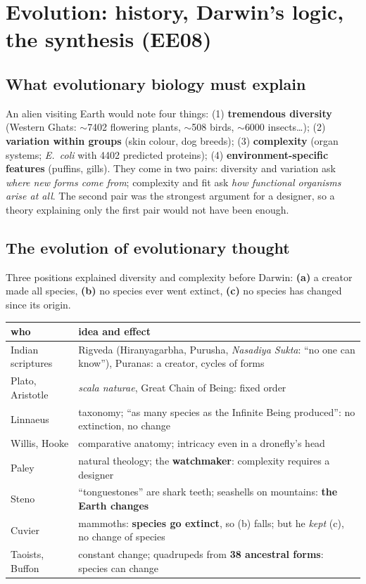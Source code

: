 \section{Evolution: history, Darwin's logic, the synthesis (EE08)}

\subsection{What evolutionary biology must explain}
An alien visiting Earth would note four things: (1) \textbf{tremendous diversity} (Western Ghats: $\sim$7402
flowering plants, $\sim$508 birds, $\sim$6000 insects\dots); (2) \textbf{variation within groups} (skin colour, dog
breeds); (3) \textbf{complexity} (organ systems; \emph{E.\ coli} with 4402 predicted proteins); (4)
\textbf{environment-specific features} (puffins, gills). They come in two pairs: diversity and variation ask
\emph{where new forms come from}; complexity and fit ask \emph{how functional organisms arise at all}. The second pair was
the strongest argument for a designer, so a theory explaining only the first pair would not have been enough.

\subsection{The evolution of evolutionary thought}
Three positions explained diversity and complexity before Darwin: \textbf{(a)} a creator made all species,
\textbf{(b)} no species ever went extinct, \textbf{(c)} no species has changed since its origin.

\begin{center}\small
\begin{tabularx}{\textwidth}{lX}
\toprule
who & idea and effect\\\midrule
Indian scriptures & Rigveda (Hiranyagarbha, Purusha, \emph{Nasadiya Sukta}: ``no one can know''), Puranas: a creator, cycles of forms\\
Plato, Aristotle & \emph{scala naturae}, Great Chain of Being: fixed order\\
Linnaeus & taxonomy; ``as many species as the Infinite Being produced'': no extinction, no change\\
Willis, Hooke & comparative anatomy; intricacy even in a dronefly's head\\
Paley & natural theology; the \textbf{watchmaker}: complexity requires a designer\\
Steno & ``tonguestones'' are shark teeth; seashells on mountains: \textbf{the Earth changes}\\
Cuvier & mammoths: \textbf{species go extinct}, so (b) falls; but he \emph{kept} (c), no change of species\\
Taoists, Buffon & constant change; quadrupeds from \textbf{38 ancestral forms}: species can change\\\bottomrule
\end{tabularx}
\end{center}

